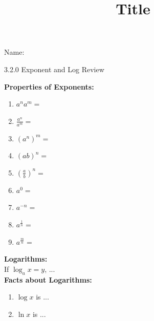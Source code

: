 \documentclass[12pt]{article}
\title{Title}
\begin{document}
 Name:
 \begin{center}\large{3.2.0 Exponent and Log Review}\end{center}


\begin{tcolorbox}

\textbf{Properties of Exponents:}
\begin{multicols}{3}
	\begin{enumerate}[itemsep=.6cm]
	\item $\displaystyle a^na^m= $\underline{\hspace{2cm}} 
	\item $\displaystyle \frac{a^n}{a^m}= $\underline{\hspace{2cm}} 
	\item $\displaystyle (a^n)^m= $\underline{\hspace{2cm}} 
	\item $\displaystyle (ab)^n= $\underline{\hspace{2cm}} 
	\item $\displaystyle \left(\frac{a}{b}\right)^n= $\underline{\hspace{2cm}} 
\item $\displaystyle a^0= $\underline{\hspace{2cm}} 
\item $\displaystyle a^{-n}= $\underline{\hspace{2cm}} 
\item $\displaystyle a^{\frac{1}{n}}= $\underline{\hspace{2cm}} 
\item $\displaystyle a^{\frac{m}{n}}= $\underline{\hspace{2cm}} 
\end{enumerate}
\end{multicols}

\textbf{Logarithms:} \\
If $\log_{a} x = y$, ...\\




\textbf{Facts about Logarithms:} 


\begin{multicols}{3}
	\begin{enumerate}[itemsep=.6cm]


\item $\log x$ is ...
\item $\ln x$ is ...


\end{enumerate}
\end{multicols}
\end{tcolorbox}
\end{document}
